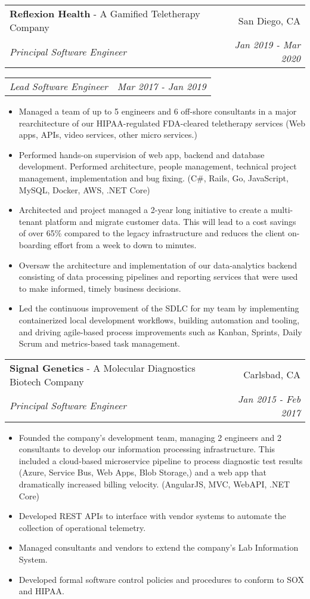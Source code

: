 \documentclass[letterpaper,11pt]{article}
\makeatletter
\newcommand{\resumeItem}[1]{
  \item\footnotesize{
    {#1 \vspace{-2pt}}
  }
}
\newcommand{\resumeSubheadingJobPosition}[5]{
  \vspace{-1pt}\item
    \begin{tabular*}{0.97\textwidth}[t]{l@{\extracolsep{\fill}}r}
      \textbf{#1} - #5 & #2 \\
      \textit{\small#3} & \textit{\small #4} \\
    \end{tabular*}\vspace{-5pt}
}
\newcommand{\resumeSubSubheading}[2]{
    \begin{tabular*}{0.97\textwidth}{l@{\extracolsep{\fill}}r}
      \textit{\small#1} & \textit{\small #2} \\
    \end{tabular*}\vspace{-5pt}
}
\newcommand{\resumeItemListStart}{\begin{itemize}}
\newcommand{\resumeItemListEnd}{\end{itemize}\vspace{-5pt}}
\makeatother
\begin{document}
    \resumeSubheadingJobPosition
        {Reflexion Health}{San Diego, CA}
        {Principal Software Engineer}{Jan 2019 - Mar 2020}
        {A Gamified Teletherapy Company}
        \resumeSubSubheading
        {Lead Software Engineer}{Mar 2017 - Jan 2019}
        \resumeItemListStart
            \resumeItem{
                Managed a team of up to 5 engineers and 6 off-shore consultants in a major rearchitecture of our HIPAA-regulated FDA-cleared teletherapy services 
                (Web apps, APIs, video services, other micro services.) 
            }                        
            \resumeItem{
                Performed hands-on supervision of web app, backend and database development. Performed architecture, 
                people management, technical project management, implementation and bug fixing. (C\#, Rails, Go, JavaScript, MySQL, Docker, AWS, .NET Core)  
            }
            \resumeItem{
                Architected and project managed a 2-year long initiative to create a multi-tenant platform and migrate customer data. This 
                will lead to a cost savings of over 65\% compared to the legacy infrastructure and reduces the client 
                on-boarding effort from a week to down to minutes.
            }
             \resumeItem{
                Oversaw the architecture and implementation of our data-analytics backend consisting of data processing pipelines and 
                reporting services that were used to make informed, timely business decisions.
            }
            \resumeItem{
                Led the continuous improvement of the SDLC for my team by implementing containerized local development workflows, building automation and tooling, and 
                driving agile-based process improvements such as Kanban, Sprints, Daily Scrum and metrics-based task management.
            }
        \resumeItemListEnd
            
      
    \resumeSubheadingJobPosition
        {Signal Genetics}{Carlsbad, CA}
        {Principal Software Engineer}{Jan 2015 - Feb 2017}
        {A Molecular Diagnostics Biotech Company}
        \resumeItemListStart
            
            \resumeItem{                
                Founded the company's development team, managing 2 engineers and 2 consultants to develop our information
                processing infrastructure. This included a cloud-based microservice pipeline to process diagnostic test results 
                (Azure, Service Bus, Web Apps, Blob Storage,) and a web app that dramatically increased billing velocity. 
                (AngularJS, MVC, WebAPI, .NET Core)
            }
            \resumeItem{
                Developed REST APIs to interface with vendor systems to automate the collection of operational telemetry.
            }                       
            \resumeItem{
                Managed consultants and vendors to extend the company's Lab Information System.
            }            
            \resumeItem{
                Developed formal software control policies and procedures to conform to SOX and HIPAA.
            }
        \resumeItemListEnd
\end{document}
